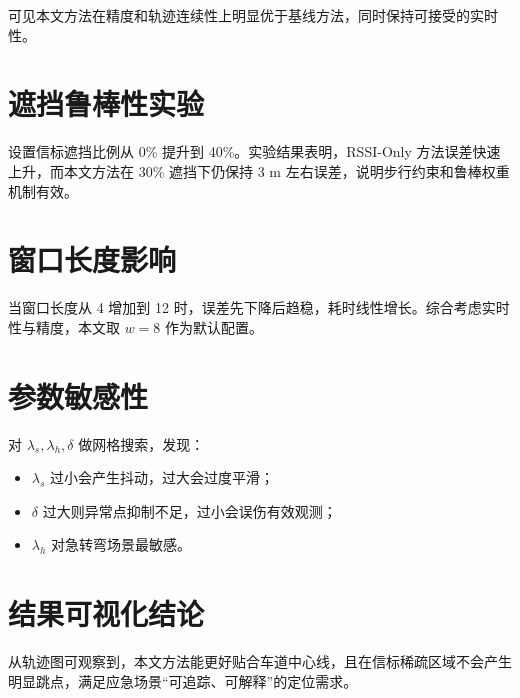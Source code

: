 可见本文方法在精度和轨迹连续性上明显优于基线方法，同时保持可接受的实时性。

\section{遮挡鲁棒性实验}
设置信标遮挡比例从 0\% 提升到 40\%。实验结果表明，RSSI-Only 方法误差快速上升，而本文方法在 30\% 遮挡下仍保持 3 m 左右误差，说明步行约束和鲁棒权重机制有效。

\section{窗口长度影响}
当窗口长度从 4 增加到 12 时，误差先下降后趋稳，耗时线性增长。综合考虑实时性与精度，本文取 $w=8$ 作为默认配置。

\section{参数敏感性}
对 $\lambda_s,\lambda_h,\delta$ 做网格搜索，发现：
\begin{itemize}
  \item $\lambda_s$ 过小会产生抖动，过大会过度平滑；
  \item $\delta$ 过大则异常点抑制不足，过小会误伤有效观测；
  \item $\lambda_h$ 对急转弯场景最敏感。
\end{itemize}

\section{结果可视化结论}
从轨迹图可观察到，本文方法能更好贴合车道中心线，且在信标稀疏区域不会产生明显跳点，满足应急场景“可追踪、可解释”的定位需求。

